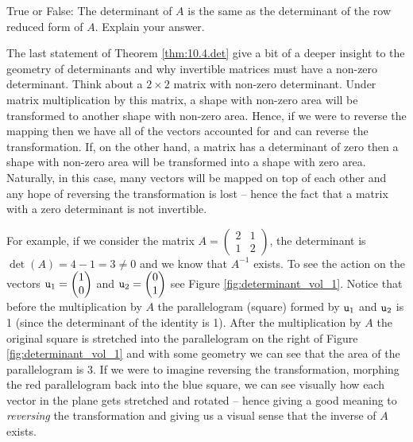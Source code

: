 \begin{problem}
    True or False: The determinant of $A$ is the same as the determinant of the row
    reduced form of $A$.  Explain your answer.
\end{problem}


The last statement of Theorem \ref{thm:10.4.det} give a bit of a deeper insight
to the geometry of determinants and why invertible matrices must have a non-zero
determinant.  Think about a $2 \times 2$ matrix with non-zero determinant.  Under matrix
multiplication by this matrix, a shape with non-zero area will be transformed to another
shape with non-zero area.  Hence, if we were to reverse the mapping then we have all of
the vectors accounted for and can reverse the transformation.  If, on the other hand, a
matrix has a determinant of zero then a shape with non-zero area will be transformed into
a shape with zero area.  Naturally, in this case, many vectors will be mapped on top of
each other and any hope of reversing the transformation is lost -- hence the fact that a
matrix with a zero determinant is not invertible.

For example, if we consider the matrix $A = \begin{pmatrix} 2&1\\1&2\end{pmatrix}$, the
determinant is $\det(A) = 4-1=3 \ne 0$ and we know that $A^{-1}$ exists.  To see the
action on the vectors $\texttt{u}_1 = \begin{pmatrix}1\\0\end{pmatrix}$ and $\texttt{u}_2 =
\begin{pmatrix}0\\1\end{pmatrix}$ see Figure \ref{fig:determinant_vol_1}.  Notice that
before the multiplication by $A$ the parallelogram (square) formed by $\texttt{u}_1$ and $\texttt{u}_2$ is 1
(since the determinant of the identity is 1).  After the multiplication by $A$ the
original square is stretched into the parallelogram on the right of Figure
\ref{fig:determinant_vol_1} and with some geometry we can see that the area of the
parallelogram is $3$.  If we were to imagine reversing the transformation, morphing the
red parallelogram back into the blue square, we can see visually how each vector in the plane gets
stretched and rotated -- hence giving a good meaning to {\it reversing} the
transformation and giving us a visual sense that the inverse of $A$ exists.

